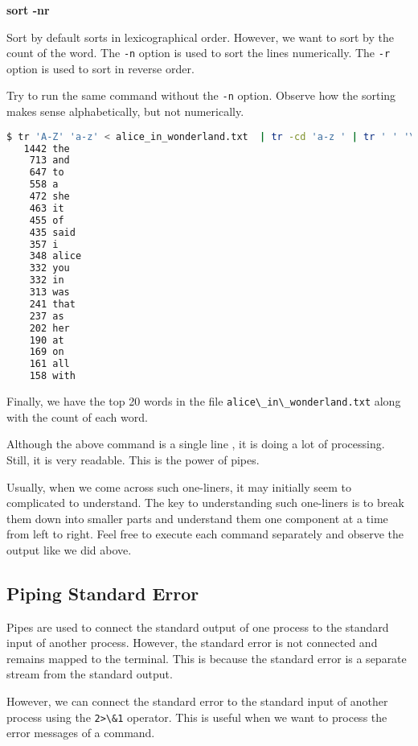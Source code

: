 \textbf{sort -nr}

Sort by default sorts in lexicographical order. However, we want to
sort by the count of the word. The \lstinline|-n| option is used to sort
the lines numerically. The \lstinline|-r| option is used to sort in
reverse order.

\begin{exercise}
  Try to run the same command without the \lstinline|-n| option.
  Observe how the sorting makes sense alphabetically, but not
  numerically.
\end{exercise}

\begin{lstlisting}[language=bash]
$ tr 'A-Z' 'a-z' < alice_in_wonderland.txt  | tr -cd 'a-z ' | tr ' ' '\n' | grep . | sort | uniq -c | sort -nr | head -20
   1442 the
    713 and
    647 to
    558 a
    472 she
    463 it
    455 of
    435 said
    357 i
    348 alice
    332 you
    332 in
    313 was
    241 that
    237 as
    202 her
    190 at
    169 on
    161 all
    158 with
\end{lstlisting}

Finally, we have the top 20 words in the file \lstinline|alice\_in\_wonderland.txt|
along with the count of each word.

Although the above command is a single line
, it is doing a lot of
processing. Still, it is very readable. This is the power of pipes.

\begin{remark}
  Usually, when we come across such one-liners, it may initially
  seem to complicated to understand. The key to understanding such
  one-liners is to break them down into smaller parts and understand
  them one component at a time from left to right. Feel free to
  execute each command separately and observe the output like we
  did above.
\end{remark}

\subsection{Piping Standard Error}

Pipes are used to connect the standard output of one process to the
standard input of another process. However, the standard error is not
connected and remains mapped to the terminal. This is because the
standard error is a separate stream from the standard output.

However, we can connect the standard error to the standard input of
another process using the \lstinline|2>\&1| operator. This is useful when
we want to process the error messages of a command.

